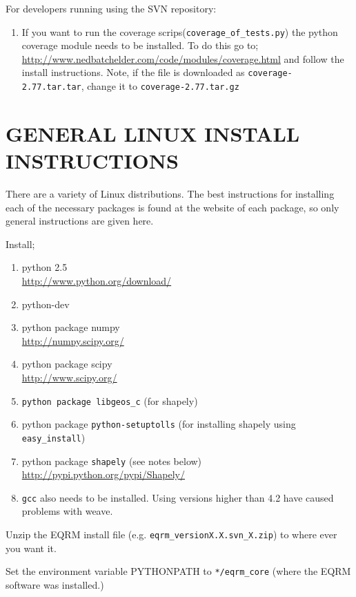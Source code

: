 \documentclass[a4paper, 12pt]{article}
\begin{document}
For developers running using the SVN repository:
\begin{enumerate}
\item If you want to run the coverage scrips(\texttt{coverage\_of\_tests.py}) the
python coverage module needs to be installed.  To do this go to; \\
\url{http://www.nedbatchelder.com/code/modules/coverage.html} and
follow the install instructions. Note, if the file is downloaded as
\texttt{coverage-2.77.tar.tar}, change it to
\texttt{coverage-2.77.tar.gz}
\end{enumerate}
%
%
%
%
\section{GENERAL LINUX INSTALL INSTRUCTIONS}

There are a variety of Linux distributions.  The best instructions
for installing each of the necessary packages is found at the
website of each package, so only general instructions are given
here.

Install;
\begin{enumerate}
\item python 2.5 \\
\url{http://www.python.org/download/}
\item python-dev
\item python package numpy \\
\url{http://numpy.scipy.org/}
\item python package scipy \\
\url{http://www.scipy.org/}
\item \texttt{python package libgeos\_c} (for shapely)
\item python package \texttt{python-setuptolls} (for installing shapely using \texttt{easy\_install})
\item python package \texttt{shapely}  (see notes below) \\
\url{http://pypi.python.org/pypi/Shapely/}
\item \texttt{gcc} also needs to be installed. Using versions higher than 4.2
have caused problems with weave.
\end{enumerate}

Unzip the EQRM install file (e.g.
\texttt{eqrm\_versionX.X.svn\_X.zip}) to where ever you want it.

Set the environment variable PYTHONPATH to \texttt{*/eqrm\_core}
(where the EQRM software was installed.)
\end{document}
